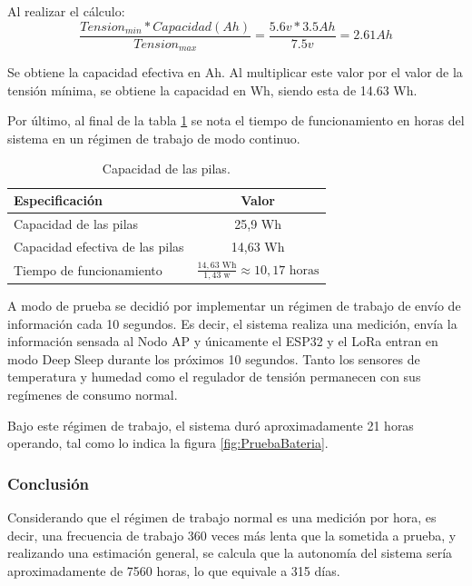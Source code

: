 Al realizar el cálculo:
\begin{equation}
   \frac{Tension_{min} * Capacidad (Ah)}{Tension_{max}} = \frac{5.6v * 3.5Ah}{7.5v} = 2.61 Ah
\label{eq:capacidadEfectiva}
\end{equation}

Se obtiene la capacidad efectiva en Ah. Al multiplicar este valor por el valor de la tensión mínima, se obtiene la capacidad en Wh, siendo esta de 14.63 Wh.

Por último, al final de la tabla \ref{tab:capacidadPilas} se nota el tiempo de funcionamiento en horas del sistema en un régimen de trabajo de modo continuo.

\begin{table}[H]
    \centering
    \begin{tabular}{@{}lc@{}}
        \toprule
        \textbf{Especificación}       & \textbf{Valor}          \\ \midrule
        Capacidad de las pilas     & 25,9 Wh       \\ 
        Capacidad efectiva de las pilas      & 14,63 Wh      \\ 
        Tiempo de funcionamiento & $\frac{14,63 \text{ Wh}}{1,43 \text{ w}} \approx 10,17 \text{ horas}$ \\ \bottomrule
    \end{tabular}
    \caption{Capacidad de las pilas.}
    \label{tab:capacidadPilas}
\end{table}

A modo de prueba se decidió por implementar un régimen de trabajo de envío de información cada 10 segundos. Es decir, el sistema realiza una medición, envía la información sensada al Nodo AP y únicamente el ESP32 y el LoRa entran en modo Deep Sleep durante los próximos 10 segundos. Tanto los sensores de temperatura y humedad como el regulador de tensión permanecen con sus regímenes de consumo normal.

Bajo este régimen de trabajo, el sistema duró aproximadamente 21 horas operando, tal como lo indica la figura \ref{fig:PruebaBateria}.

\subsubsection{Conclusión}
Considerando que el régimen de trabajo normal es una medición por hora, es decir, una frecuencia de trabajo 360 veces más lenta que la sometida a prueba, y realizando una estimación general, se calcula que la autonomía del sistema sería aproximadamente de 7560 horas, lo que equivale a 315 días.


